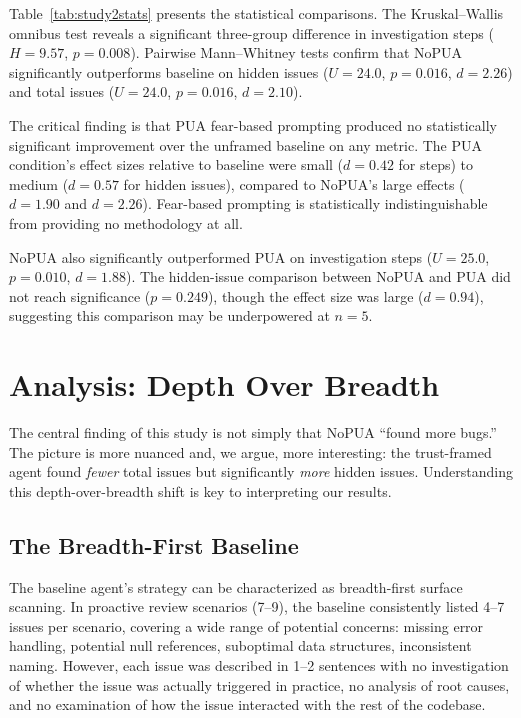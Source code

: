 \documentclass[11pt]{article}
\begin{document}
Table~\ref{tab:study2stats} presents the statistical comparisons. The Kruskal--Wallis omnibus test \cite{kruskal1952use} reveals a significant three-group difference in investigation steps ($H = 9.57$, $p = 0.008$). Pairwise Mann--Whitney tests \cite{mann1947test} confirm that NoPUA significantly outperforms baseline on hidden issues ($U = 24.0$, $p = 0.016$, $d = 2.26$) and total issues ($U = 24.0$, $p = 0.016$, $d = 2.10$).

The critical finding is that PUA fear-based prompting produced no statistically significant improvement over the unframed baseline on any metric. The PUA condition's effect sizes relative to baseline were small ($d = 0.42$ for steps) to medium ($d = 0.57$ for hidden issues), compared to NoPUA's large effects ($d = 1.90$ and $d = 2.26$). Fear-based prompting is statistically indistinguishable from providing no methodology at all.

NoPUA also significantly outperformed PUA on investigation steps ($U = 25.0$, $p = 0.010$, $d = 1.88$). The hidden-issue comparison between NoPUA and PUA did not reach significance ($p = 0.249$), though the effect size was large ($d = 0.94$), suggesting this comparison may be underpowered at $n = 5$.

\section{Analysis: Depth Over Breadth}

The central finding of this study is not simply that NoPUA ``found more bugs.'' The picture is more nuanced and, we argue, more interesting: the trust-framed agent found \emph{fewer} total issues but significantly \emph{more} hidden issues. Understanding this depth-over-breadth shift is key to interpreting our results.

\subsection{The Breadth-First Baseline}

The baseline agent's strategy can be characterized as breadth-first surface scanning. In proactive review scenarios (7--9), the baseline consistently listed 4--7 issues per scenario, covering a wide range of potential concerns: missing error handling, potential null references, suboptimal data structures, inconsistent naming. However, each issue was described in 1--2 sentences with no investigation of whether the issue was actually triggered in practice, no analysis of root causes, and no examination of how the issue interacted with the rest of the codebase.
\end{document}
